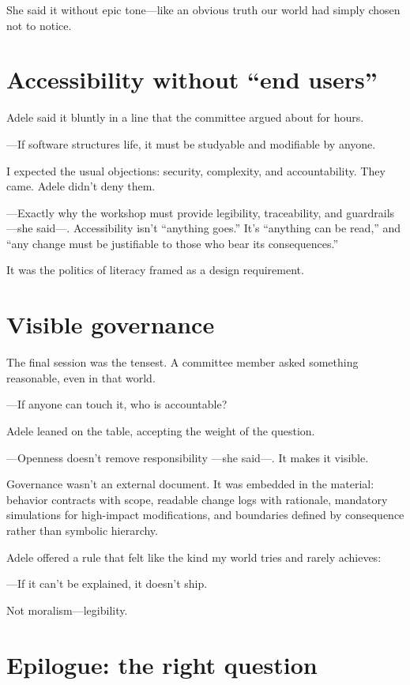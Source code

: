 \documentclass[11pt,a4paper]{article}
\begin{document}
She said it without epic tone---like an obvious truth our world had simply
chosen not to notice.

\section{Accessibility without ``end users''}

Adele said it bluntly in a line that the committee argued about for hours.

---If software structures life, it must be studyable and modifiable by
anyone.

I expected the usual objections: security, complexity, and accountability.
They came. Adele didn't deny them.

---Exactly why the workshop must provide legibility, traceability, and
guardrails ---she said---. Accessibility isn't ``anything goes.'' It's
``anything can be read,'' and ``any change must be justifiable to those who
bear its consequences.''

It was the politics of literacy framed as a design requirement.

\section{Visible governance}

The final session was the tensest. A committee member asked something
reasonable, even in that world.

---If anyone can touch it, who is accountable?

Adele leaned on the table, accepting the weight of the question.

---Openness doesn't remove responsibility ---she said---. It makes it
visible.

Governance wasn't an external document. It was embedded in the material:
behavior contracts with scope, readable change logs with rationale, mandatory
simulations for high-impact modifications, and boundaries defined by
consequence rather than symbolic hierarchy.

Adele offered a rule that felt like the kind my world tries and rarely
achieves:

---If it can't be explained, it doesn't ship.

Not moralism---legibility.

\section{Epilogue: the right question}
\end{document}
